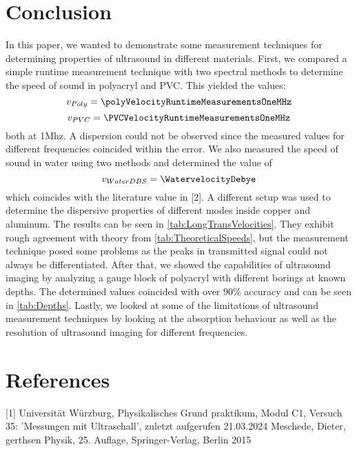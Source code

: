 \documentclass[a4paper,10pt,twocolumn]{article}
\begin{document}
    \section{Conclusion}
    In this paper, we wanted to demonstrate some measurement techniques for determining properties of ultrasound in different materials.
    First, we compared a simple runtime measurement technique with two spectral methods to determine the speed of sound in polyacryl and PVC.
    This yielded the values:
    \begin{equation}
        v_{Poly} = \polyVelocityRuntimeMeasurementsOneMHz
    \end{equation}
    \begin{equation}
        v_{PVC} = \PVCVelocityRuntimeMeasurementsOneMHz
    \end{equation}
    both at 1Mhz.
    A dispersion could not be observed since the measured values for different frequencies coincided within the error.
    We also measured the speed of sound in water using two methods and determined the value of
    \begin{equation}
        v_{WaterDBS} = \WatervelocityDebye
    \end{equation}
    which coincides with the literature value in [2].
    A different setup was used to determine the dispersive properties of different modes inside copper and aluminum.
    The results can be seen in \autoref{tab:LongTransVelocities}.
    They exhibit rough agreement with theory from \autoref{tab:TheoreticalSpeeds}, but the measurement technique posed some problems as the peaks in transmitted signal could not always be differentiated.
    After that, we showed the capabilities of ultrasound imaging by analyzing a gauge block of polyacryl with different borings at known depths.
    The determined values coincided with over $90 \% $ accuracy and can be seen in \autoref{tab:Depths}.
    Lastly, we looked at some of the limitations of ultrasound measurement techniques by looking at the absorption behaviour as well as the resolution of ultrasound imaging for different frequencies.
    
    \section{References}
    [1] Universität Würzburg, Physikalisches Grund
    praktikum, Modul C1, Versuch 35: ’Messungen mit
    Ultraschall’, zuletzt aufgerufen 21.03.2024
    \newline
    [2] Meschede, Dieter, gerthsen Physik, 25. Auflage, Springer-Verlag, Berlin 2015
    \newpage
    \newpage
\end{document}
